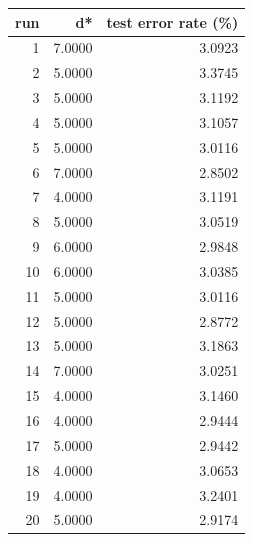 \begin{tabular}{rrr}
\toprule
run & d* & test error rate (\%) \\
\midrule
1 & 7.0000 & 3.0923 \\
2 & 5.0000 & 3.3745 \\
3 & 5.0000 & 3.1192 \\
4 & 5.0000 & 3.1057 \\
5 & 5.0000 & 3.0116 \\
6 & 7.0000 & 2.8502 \\
7 & 4.0000 & 3.1191 \\
8 & 5.0000 & 3.0519 \\
9 & 6.0000 & 2.9848 \\
10 & 6.0000 & 3.0385 \\
11 & 5.0000 & 3.0116 \\
12 & 5.0000 & 2.8772 \\
13 & 5.0000 & 3.1863 \\
14 & 7.0000 & 3.0251 \\
15 & 4.0000 & 3.1460 \\
16 & 4.0000 & 2.9444 \\
17 & 5.0000 & 2.9442 \\
18 & 4.0000 & 3.0653 \\
19 & 4.0000 & 3.2401 \\
20 & 5.0000 & 2.9174 \\
\bottomrule
\end{tabular}
